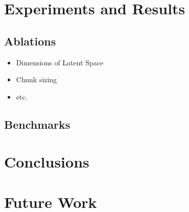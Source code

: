 \documentclass[12pt, a4paper]{article}
\begin{document}
\section{Experiments and Results}
\label{sec:experiments}


\subsection{Ablations}

\begin{itemize}
    \item Dimensions of Latent Space
    \item Chunk sizing
    \item etc.
\end{itemize}

\subsection{Benchmarks}


\section{Conclusions}
\label{sec:conclusions}


\section{Future Work}



\end{document}
